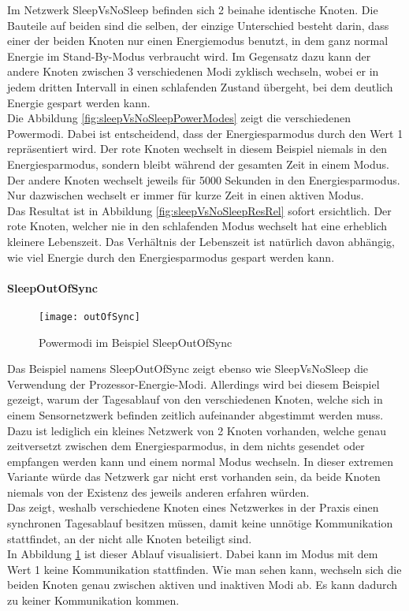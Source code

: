 Im Netzwerk SleepVsNoSleep befinden sich 2 beinahe identische Knoten. Die Bauteile auf beiden sind die selben, der einzige Unterschied besteht darin, dass einer der beiden Knoten nur einen Energiemodus benutzt, in dem ganz normal Energie im Stand-By-Modus verbraucht wird. Im Gegensatz dazu kann der andere Knoten zwischen 3 verschiedenen Modi zyklisch wechseln, wobei er in jedem dritten Intervall in einen schlafenden Zustand übergeht, bei dem deutlich Energie gespart werden kann.\\
Die Abbildung \ref{fig:sleepVsNoSleepPowerModes} zeigt die verschiedenen Powermodi. Dabei ist entscheidend, dass der Energiesparmodus durch den Wert 1 repräsentiert wird. Der rote Knoten wechselt in diesem Beispiel niemals in den Energiesparmodus, sondern bleibt während der gesamten Zeit in einem Modus. Der andere Knoten wechselt jeweils für 5000 Sekunden in den Energiesparmodus. Nur dazwischen wechselt er immer für kurze Zeit in einen aktiven Modus.\\
Das Resultat ist in Abbildung \ref{fig:sleepVsNoSleepResRel} sofort ersichtlich. Der rote Knoten, welcher nie in den schlafenden Modus wechselt hat eine erheblich kleinere Lebenszeit. Das Verhältnis der Lebenszeit ist natürlich davon abhängig, wie viel Energie durch den Energiesparmodus gespart werden kann.

\paragraph{SleepOutOfSync}

\begin{figure}[htbp]
\centering
\caption{Powermodi im Beispiel SleepOutOfSync}
\label{fig:sleepOutOfSyncModes}
\texttt{[image: outOfSync]}
\end{figure}

Das Beispiel namens SleepOutOfSync zeigt ebenso wie SleepVsNoSleep die Verwendung der Prozessor-Energie-Modi. Allerdings wird bei diesem Beispiel gezeigt, warum der Tagesablauf von den verschiedenen Knoten, welche sich in einem Sensornetzwerk befinden zeitlich aufeinander abgestimmt werden muss.\\
Dazu ist lediglich ein kleines Netzwerk von 2 Knoten vorhanden, welche genau zeitversetzt zwischen dem Energiesparmodus, in dem nichts gesendet oder empfangen werden kann und einem normal Modus wechseln. In dieser extremen Variante würde das Netzwerk gar nicht erst vorhanden sein, da beide Knoten niemals von der Existenz des jeweils anderen erfahren würden.\\
Das zeigt, weshalb verschiedene Knoten eines Netzwerkes in der Praxis einen synchronen Tagesablauf besitzen müssen, damit keine unnötige Kommunikation stattfindet, an der nicht alle Knoten beteiligt sind.\\
In Abbildung \ref{fig:sleepOutOfSyncModes} ist dieser Ablauf visualisiert. Dabei kann im Modus mit dem Wert 1 keine Kommunikation stattfinden. Wie man sehen kann, wechseln sich die beiden Knoten genau zwischen aktiven und inaktiven Modi ab. Es kann dadurch zu keiner Kommunikation kommen.
